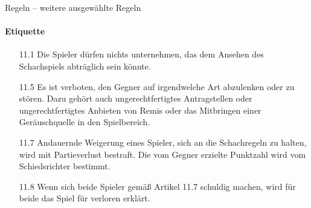\documentclass[
  aspectratio=1610,
]{beamer}
\begin{document}
\begin{frame}[<+->]{Regeln – weitere ausgewählte Regeln}
  \framesubtitle{Etiquette}
  \begin{itemize}
    \item[11.1] Die Spieler dürfen nichts unternehmen, das dem Ansehen des Schachspiels
      abträglich sein könnte.
    \item[11.5] Es ist verboten, den Gegner auf irgendwelche Art abzulenken oder zu
      stören.  Dazu gehört auch ungerechtfertigtes Antragstellen oder ungerechtfertigtes
      Anbieten von Remis oder das Mitbringen einer Geräuschquelle in den Spielbereich.
    \item[11.7] Andauernde Weigerung eines Spieler, sich an die Schachregeln zu halten,
      wird mit Partieverlust bestraft. Die vom Gegner erzielte Punktzahl wird vom
      Schiedsrichter bestimmt.
    \item[11.8] Wenn sich beide Spieler gemäß Artikel 11.7 schuldig machen, wird für beide
      das Spiel für verloren erklärt.
  \end{itemize}
\end{frame}
\end{document}
